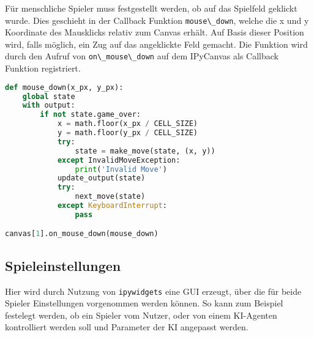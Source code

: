 Für menschliche Spieler muss festgestellt werden, ob auf das Spielfeld
geklickt wurde. Dies geschieht in der Callback Funktion
\passthrough{\lstinline!mouse\_down!}, welche die x und y Koordinate des
Mausklicks relativ zum Canvas erhält. Auf Basis dieser Position wird,
falls möglich, ein Zug auf das angeklickte Feld gemacht. Die Funktion
wird durch den Aufruf von \passthrough{\lstinline!on\_mouse\_down!} auf
dem IPyCanvas als Callback Funktion registriert.

\begin{lstlisting}[language=Python]
def mouse_down(x_px, y_px):
    global state
    with output:
        if not state.game_over:
            x = math.floor(x_px / CELL_SIZE)
            y = math.floor(y_px / CELL_SIZE)
            try:
                state = make_move(state, (x, y))
            except InvalidMoveException:
                print('Invalid Move')
            update_output(state)
            try:
                next_move(state)
            except KeyboardInterrupt:
                pass

canvas[1].on_mouse_down(mouse_down)
\end{lstlisting}

\hypertarget{spieleinstellungen}{%
\subsection{Spieleinstellungen}\label{spieleinstellungen}}

Hier wird durch Nutzung von \passthrough{\lstinline!ipywidgets!} eine
\ac{GUI} erzeugt, über die für beide Spieler Einstellungen vorgenommen
werden können. So kann zum Beispiel festelegt werden, ob ein Spieler vom
Nutzer, oder von einem \ac{KI}-Agenten kontrolliert werden soll und
Parameter der \ac{KI} angepasst werden.

